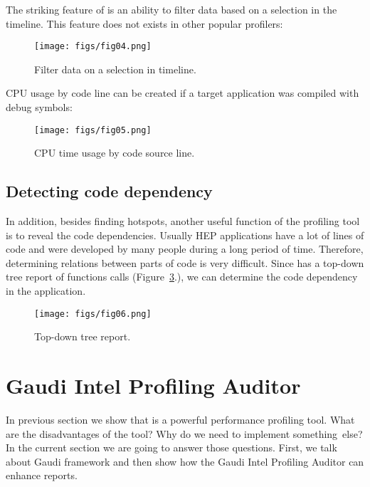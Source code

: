 \documentclass[a4paper]{jpconf}
\begin{document}
The striking feature of \amp is an ability to filter data based on a selection in the timeline. This feature 
does not exists in other popular profilers:

\begin{figure}[H]
\begin{minipage}{\textwidth}
\texttt{[image: figs/fig04.png]}
\caption{\label{fig04}Filter data on a selection in timeline.}
\end{minipage}
\end{figure}

CPU usage by code line can be created if a target application was compiled with debug symbols:

\begin{figure}[H]
\begin{minipage}{\textwidth}
\texttt{[image: figs/fig05.png]}
\caption{\label{fig05}CPU time usage by code source line.}
\end{minipage}
\end{figure}

\subsection{Detecting code dependency}

In addition, besides finding hotspots, another useful function of the profiling tool is to reveal the code dependencies. 
Usually HEP applications have a lot of lines of code and were developed by many people during a long period of time. 
Therefore, determining relations between parts of code is very difficult. Since \amp  has a top-down tree report of 
functions calls (Figure~\ref{fig06}.),  we can determine the code dependency in the application.

\begin{figure}[H]
\begin{minipage}{\textwidth}
\texttt{[image: figs/fig06.png]}
\caption{\label{fig06}Top-down tree report.}
\end{minipage}
\end{figure}

\section{Gaudi Intel Profiling Auditor}

In previous section we show that \iamp is a powerful performance profiling tool. What are the disadvantages of the tool? 
Why do we need to implement something~else? In the current section we are going to answer those questions. 
First, we talk about Gaudi framework and then show how the Gaudi Intel Profiling Auditor can enhance \amp reports.
\end{document}
